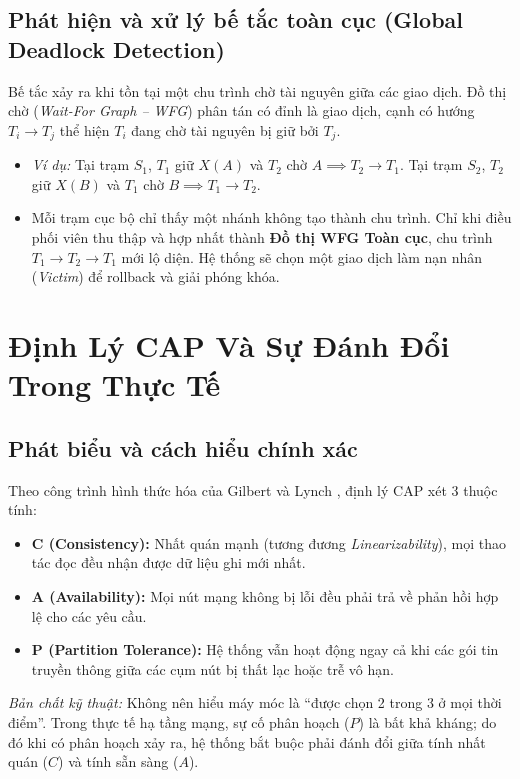 \documentclass[12pt,a4paper]{report}
\begin{document}
\subsection{Phát hiện và xử lý bế tắc toàn cục (Global Deadlock Detection)}
Bế tắc xảy ra khi tồn tại một chu trình chờ tài nguyên giữa các giao dịch. Đồ thị chờ (\textit{Wait-For Graph -- WFG}) phân tán có đỉnh là giao dịch, cạnh có hướng $T_i \rightarrow T_j$ thể hiện $T_i$ đang chờ tài nguyên bị giữ bởi $T_j$.
\begin{itemize}[leftmargin=0.8cm, topsep=1pt, itemsep=1pt]
    \item \textit{Ví dụ:} Tại trạm $S_1$, $T_1$ giữ $X(A)$ và $T_2$ chờ $A \implies T_2 \rightarrow T_1$. Tại trạm $S_2$, $T_2$ giữ $X(B)$ và $T_1$ chờ $B \implies T_1 \rightarrow T_2$.
    \item Mỗi trạm cục bộ chỉ thấy một nhánh không tạo thành chu trình. Chỉ khi điều phối viên thu thập và hợp nhất thành \textbf{Đồ thị WFG Toàn cục}, chu trình $T_1 \rightarrow T_2 \rightarrow T_1$ mới lộ diện. Hệ thống sẽ chọn một giao dịch làm nạn nhân (\textit{Victim}) để rollback và giải phóng khóa.
\end{itemize}

\section{Định Lý CAP Và Sự Đánh Đổi Trong Thực Tế}

\subsection{Phát biểu và cách hiểu chính xác}
Theo công trình hình thức hóa của Gilbert và Lynch \cite{gilbert2002}, định lý CAP xét 3 thuộc tính:
\begin{itemize}[leftmargin=0.8cm, topsep=1pt, itemsep=1pt]
    \item \textbf{C (Consistency):} Nhất quán mạnh (tương đương \textit{Linearizability}), mọi thao tác đọc đều nhận được dữ liệu ghi mới nhất.
    \item \textbf{A (Availability):} Mọi nút mạng không bị lỗi đều phải trả về phản hồi hợp lệ cho các yêu cầu.
    \item \textbf{P (Partition Tolerance):} Hệ thống vẫn hoạt động ngay cả khi các gói tin truyền thông giữa các cụm nút bị thất lạc hoặc trễ vô hạn.
\end{itemize}
\textit{Bản chất kỹ thuật:} Không nên hiểu máy móc là ``được chọn 2 trong 3 ở mọi thời điểm''. Trong thực tế hạ tầng mạng, sự cố phân hoạch ($P$) là bất khả kháng; do đó khi có phân hoạch xảy ra, hệ thống bắt buộc phải đánh đổi giữa tính nhất quán ($C$) và tính sẵn sàng ($A$).
\end{document}
